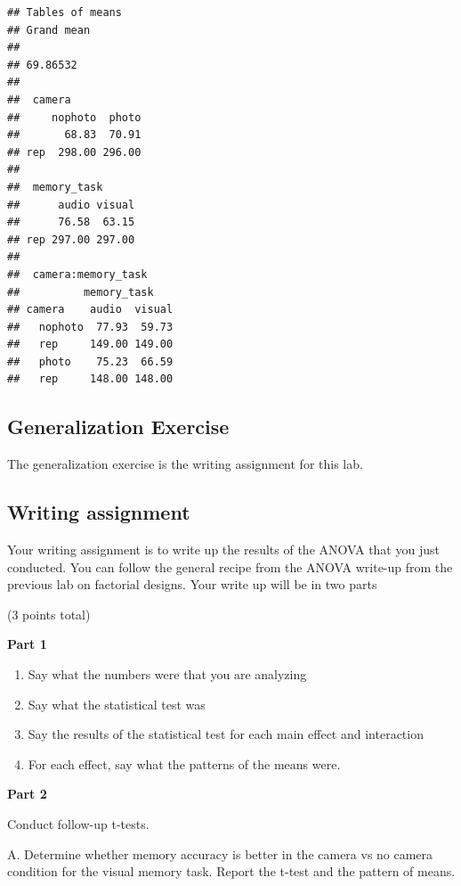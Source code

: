 \documentclass[
]{book}
\providecommand{\tightlist}{%
  \setlength{\itemsep}{0pt}\setlength{\parskip}{0pt}}
\begin{document}
\begin{verbatim}
## Tables of means
## Grand mean
##          
## 69.86532 
## 
##  camera 
##     nophoto  photo
##       68.83  70.91
## rep  298.00 296.00
## 
##  memory_task 
##      audio visual
##      76.58  63.15
## rep 297.00 297.00
## 
##  camera:memory_task 
##          memory_task
## camera    audio  visual
##   nophoto  77.93  59.73
##   rep     149.00 149.00
##   photo    75.23  66.59
##   rep     148.00 148.00
\end{verbatim}

\hypertarget{generalization-exercise-8}{%
\subsection{Generalization Exercise}\label{generalization-exercise-8}}

The generalization exercise is the writing assignment for this lab.

\hypertarget{writing-assignment-7}{%
\subsection{Writing assignment}\label{writing-assignment-7}}

Your writing assignment is to write up the results of the ANOVA that you just conducted. You can follow the general recipe from the ANOVA write-up from the previous lab on factorial designs. Your write up will be in two parts

(3 points total)

\textbf{Part 1}

\begin{enumerate}
\def\labelenumi{\arabic{enumi}.}
\tightlist
\item
  Say what the numbers were that you are analyzing
\item
  Say what the statistical test was
\item
  Say the results of the statistical test for each main effect and interaction
\item
  For each effect, say what the patterns of the means were.
\end{enumerate}

\textbf{Part 2}

Conduct follow-up t-tests.

A. Determine whether memory accuracy is better in the camera vs no camera condition for the visual memory task. Report the t-test and the pattern of means.
\end{document}
